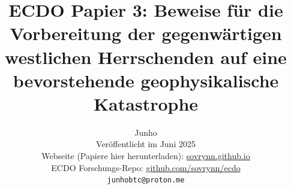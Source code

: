 \documentclass[10pt,twocolumn,letterpaper]{article}
\begin{document}
\title{ECDO Papier 3: Beweise für die Vorbereitung der gegenwärtigen westlichen Herrschenden auf eine bevorstehende geophysikalische Katastrophe}

\author{Junho\\
Veröffentlicht im Juni 2025\\
Webseite (Papiere hier herunterladen): \href{https://sovrynn.github.io}{sovrynn.github.io}\\
ECDO Forschungs-Repo: \href{https://github.com/sovrynn/ecdo}{github.com/sovrynn/ecdo}\\
{\tt\small junhobtc@proton.me}
}

\maketitle
\end{document}

